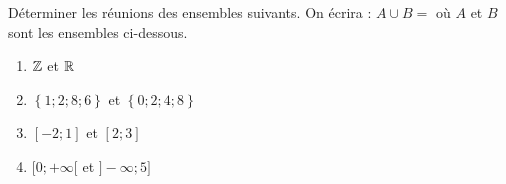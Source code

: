 
Déterminer les réunions des ensembles suivants. On écrira : $A \cup B = $ où $A$ et $B$ sont les ensembles ci-dessous.
\begin{enumerate}
\item $\mathbb Z$ et $\mathbb R$
\item $\left\lbrace 1;2;8;6  \right\rbrace $ et $\left\lbrace 0;2;4;8  \right\rbrace $
\item $[-2;1]$ et $[2;3]$
\item $[0;+\infty[$ et $]-\infty;5]$
\end{enumerate}